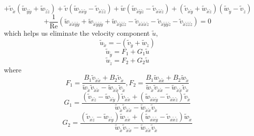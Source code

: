 \documentclass{article}
\begin{document}
\begin{equation*}
+ \tilde{v}_{\tilde{x}}(\tilde{w}_{\tilde{y}\tilde{y}}+\tilde{w}_{\tilde{z}\tilde{z}}) + \tilde{v}(\tilde{w}_{\tilde{x}\tilde{x}\tilde{y}}-\tilde{v}_{\tilde{x}\tilde{z}\tilde{z}}) + \tilde{w}(\tilde{w}_{\tilde{x}\tilde{y}\tilde{z}}-\tilde{v}_{\tilde{x}\tilde{x}\tilde{z}}) + (\tilde{v}_{\tilde{x}\tilde{y}}+\tilde{w}_{\tilde{x}\tilde{z}})(\tilde{w}_{\tilde{y}}-\tilde{v}_{\tilde{z}})
\end{equation*}
\begin{equation*}
+ \frac{1}{\operatorname{Re}} (\tilde{w}_{\tilde{x}\tilde{x}\tilde{y}\tilde{y}}+\tilde{w}_{\tilde{x}\tilde{y}\tilde{y}\tilde{y}}+\tilde{w}_{\tilde{x}\tilde{y}\tilde{z}\tilde{z}}-\tilde{v}_{\tilde{x}\tilde{x}\tilde{x}\tilde{z}}-\tilde{v}_{\tilde{x}\tilde{y}\tilde{y}\tilde{z}}-\tilde{v}_{\tilde{x}\tilde{z}\tilde{z}\tilde{z}}) = 0
\end{equation*}
which helps us eliminate the velocity component $\tilde{u}$,
\begin{equation} \label{eqn30}
\tilde{u}_{\tilde{x}} = -(\tilde{v}_{\tilde{y}} + \tilde{w}_{\tilde{z}})
\end{equation}
\begin{equation} \label{eqn31}
\tilde{u}_{\tilde{y}} = F_1 + G_1 \tilde{u}
\end{equation}
\begin{equation} \label{eqn32}
\tilde{u}_{\tilde{z}} = F_2 + G_2 \tilde{u}
\end{equation}
where
\begin{equation} \label{eqn35}
F_1 = \frac{B_1 \tilde{v}_{\tilde{x}\tilde{x}} + B_2 \tilde{v}_{\tilde{x}}}{\tilde{w}_{\tilde{x}}\tilde{v}_{\tilde{x}\tilde{x}}-\tilde{w}_{\tilde{x}\tilde{x}}\tilde{v}_{\tilde{x}}}, F_2 = \frac{B_1 \tilde{w}_{\tilde{x}\tilde{x}} + B_2 \tilde{w}_{\tilde{x}}}{\tilde{w}_{\tilde{x}}\tilde{v}_{\tilde{x}\tilde{x}}-\tilde{w}_{\tilde{x}\tilde{x}}\tilde{v}_{\tilde{x}}}
\end{equation}
\begin{equation} \label{eqn33}
G_1 = \frac{(\tilde{v}_{\tilde{x}\tilde{z}}-\tilde{w}_{\tilde{x}\tilde{y}})\tilde{v}_{\tilde{x}\tilde{x}}+(\tilde{w}_{\tilde{x}\tilde{x}\tilde{y}}-\tilde{v}_{\tilde{x}\tilde{x}\tilde{z}})\tilde{v}_{\tilde{x}}}{\tilde{w}_{\tilde{x}}\tilde{v}_{\tilde{x}\tilde{x}}-\tilde{w}_{\tilde{x}\tilde{x}}\tilde{v}_{\tilde{x}}}
\end{equation}
\begin{equation} \label{eqn34}
G_2 = \frac{(\tilde{v}_{\tilde{x}\tilde{z}}-\tilde{w}_{\tilde{x}\tilde{y}})\tilde{w}_{\tilde{x}\tilde{x}}+(\tilde{w}_{\tilde{x}\tilde{x}\tilde{y}}-\tilde{v}_{\tilde{x}\tilde{x}\tilde{z}})\tilde{w}_{\tilde{x}}}{\tilde{w}_{\tilde{x}}\tilde{v}_{\tilde{x}\tilde{x}}-\tilde{w}_{\tilde{x}\tilde{x}}\tilde{v}_{\tilde{x}}}
\end{equation}
\end{document}
